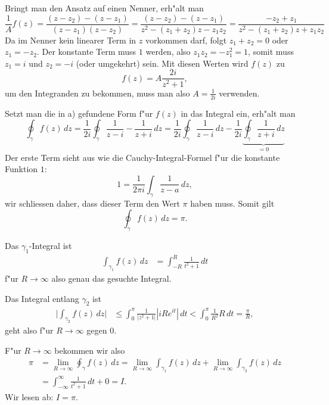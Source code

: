 \begin{loesung}
\begin{teilaufgaben}
\item
Bringt man den Ansatz auf einen Nenner, erh"alt man
\[
\frac1Af(z)
=
\frac{(z-z_2)-(z-z_1)}{(z-z_1)(z-z_2)}
=
\frac{(z-z_2)-(z-z_1)}{z^2-(z_1+z_2)z-z_1z_2}
=
\frac{-z_2+z_1}{z^2-(z_1+z_2)z+z_1z_2}
\]
Da im Nenner kein linearer Term in $z$ vorkommen darf, folgt
$z_1+z_2=0$ oder $z_1=-z_2$.
Der konstante Term muss $1$ werden, also $z_1z_2=-z_1^2=1$,
somit muss $z_1=i$ und $z_2=-i$ (oder umgekehrt) sein.
Mit diesen Werten wird $f(z)$ zu
\[
f(z)=A\frac{2i}{z^2+1},
\]
um den Integranden zu bekommen, muss man also $A=\frac1{2i}$ verwenden.
\item
Setzt man die in a) gefundene Form f"ur $f(z)$ in das Integral ein, erh"alt
man
\[
\oint_\gamma f(z)\,dz
=
\frac1{2i}
\oint_\gamma
\frac{1}{z-i}-\frac{1}{z+i}\,dz
=
\frac1{2i} \oint_\gamma \frac{1}{z-i}\,dz
-
\frac1{2i}
\underbrace{\oint_\gamma \frac{1}{z+i}\,dz}_{\textstyle=0}
\]
Der erste Term sieht aus wie die Cauchy-Integral-Formel f"ur die konstante
Funktion $1$:
\[
1=\frac1{2\pi i}\int_\gamma \frac{1}{z-a}\,dz,
\]
wir schliessen daher, dass dieser Term den Wert $\pi$ haben muss.
Somit gilt
\[
\oint_\gamma f(z)\,dz
=
\pi.
\]
\item
Das $\gamma_1$-Integral ist
\begin{align*}
\int_{\gamma_1} f(z)\,dz &= \int_{-R}^{R} \frac1{t^2+1}\,dt
\end{align*}
f"ur $R\to\infty$ also genau das gesuchte Integral.
\item
Das Integral entlang $\gamma_2$ ist
\begin{align*}
\biggl|\int_{\gamma_2} f(z)\,dz\biggr|
&
\le
\int_0^\pi \frac1{|z^2+1|} |iRe^{it}|\,dt
<
\int_0^\pi \frac1{R^2} R\,dt
=\frac{\pi}{R},
\end{align*}
geht also f"ur $R\to\infty$ gegen 0.
\item
F"ur $R\to\infty$ bekommen wir also
\begin{align*}
\pi
&=
\lim_{R\to\infty}\oint_{\gamma} f(z)\,dz
=
\lim_{R\to\infty}\int_{\gamma_1} f(z)\,dz
+
\lim_{R\to\infty}\int_{\gamma_2} f(z)\,dz
\\
&=
\int_{-\infty}^{\infty} \frac1{t^2+1}\,dt + 0 = I.
\end{align*}
Wir lesen ab: $I=\pi$.
\qedhere
\end{teilaufgaben}
\end{loesung}



